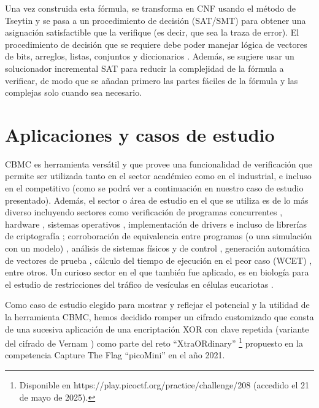 \documentclass[runningheads]{llncs}
\begin{document}
Una vez construida esta fórmula, se transforma en CNF usando el método de Tseytin y se pasa a un procedimiento de decisión (SAT/SMT) para obtener una asignación satisfactible que la verifique (es decir, que sea la traza de error).
El procedimiento de decisión que se requiere debe poder manejar lógica de vectores de bits, arreglos, listas, conjuntos y diccionarios \cite{cbmc-slides}.
Además, se sugiere usar un solucionador incremental SAT para reducir la complejidad de la fórmula a verificar, de modo que se añadan primero las partes fáciles de la fórmula y las complejas solo cuando sea necesario.

\section{Aplicaciones y casos de estudio}
CBMC es herramienta versátil y que provee una funcionalidad de verificación que permite ser utilizada tanto en el sector académico como en el industrial, e incluso en el competitivo (como se podrá ver a continuación en nuestro caso de estudio presentado).
Además, el sector o área de estudio en el que se utiliza es de lo más diverso incluyendo sectores como verificación de programas concurrentes \cite{cbmc-concurrent}, hardware \cite{cbmc-hardware-case}, sistemas operativos \cite{cbmc-tinyos-case}, implementación de drivers \cite{cbmc-drivers-case} e incluso de librerías de criptografía \cite{cbmc-ecc-case,cbmc-prng-case}; corroboración de equivalencia entre programas (o una simulación con un modelo) \cite{cbmc-equiv-code-generators-case,cbmc-equiv-stateflow-case}, análisis de sistemas físicos y de control \cite{cbmc-vehicles-case}, generación automática de vectores de prueba \cite{cbmc-testing-case1,cbmc-testing-case2}, cálculo del tiempo de ejecución en el peor caso (WCET) \cite{cbmc-wcet-case}, entre otros.
Un curioso sector en el que también fue aplicado, es en biología para el estudio de restricciones del tráfico de vesículas en células eucariotas \cite{cbmc-biology-case}.

Como caso de estudio elegido para mostrar y reflejar el potencial y la utilidad de la herramienta CBMC, hemos decidido romper un cifrado customizado que consta de una sucesiva aplicación de una encriptación XOR con clave repetida (variante del cifrado de Vernam \cite{crypto-book}) como parte del reto ``XtraORdinary'' \footnote[3]{Disponible en https://play.picoctf.org/practice/challenge/208 (accedido el 21 de mayo de 2025).} propuesto en la competencia Capture The Flag ``picoMini'' en el año 2021.
\end{document}
